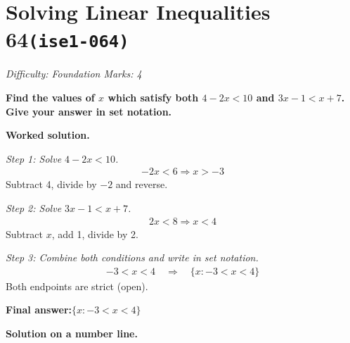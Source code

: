 \documentclass[11pt]{article}
\newcommand{\question}[1]{\par\medskip\noindent\textbf{#1}\par}
\begin{document}
\section*{Solving Linear Inequalities 64\quad\small\texttt{(ise1-064)}}
\textit{Difficulty: Foundation \quad\textbar\quad Marks: 4}

\question{Find the values of \( x \) which satisfy both \( 4 - 2x < 10 \) and \( 3x - 1 < x + 7 \). Give your answer in set notation.}

\textbf{Worked solution.}

\textit{Step 1: Solve \( 4 - 2x < 10 \).}
\[\begin{gathered}
-2x < 6 \Rightarrow x > -3
\end{gathered}\]
Subtract 4, divide by \(-2\) and reverse.

\textit{Step 2: Solve \( 3x - 1 < x + 7 \).}
\[\begin{gathered}
2x < 8 \Rightarrow x < 4
\end{gathered}\]
Subtract \( x \), add 1, divide by 2.

\textit{Step 3: Combine both conditions and write in set notation.}
\[\begin{gathered}
-3 < x < 4 \quad \Rightarrow \quad \{x : -3 < x < 4\}
\end{gathered}\]
Both endpoints are strict (open).

\begin{answerbox}
\textbf{Final answer:}\quad \(\displaystyle  \{x : -3 < x < 4\} \)
\end{answerbox}
\textbf{Solution on a number line.}
\end{document}
